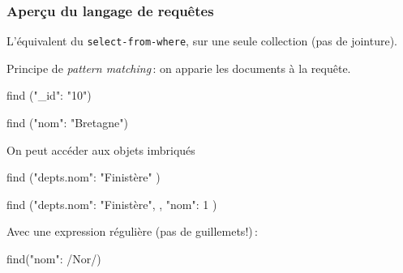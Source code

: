 \begin{frame}[fragile]
\frametitle{Aperçu du langage de requêtes}

L'équivalent du \texttt{select-from-where}, \alert{sur une
seule collection} (pas de \alert{jointure}).

\vfill

Principe de \textit{pattern matching}\,: on apparie
les documents à la requête.

\vfill

\begin{redbullet}
\item 
\begin{smallverbatim}
find ({"_id": "10"})
\end{smallverbatim}

\item
\begin{smallverbatim}
find ({"nom": "Bretagne"})
\end{smallverbatim}
\item
On peut accéder aux objets imbriqués


\begin{smallverbatim}
find ({"depts.nom": "Finistère"} )
\end{smallverbatim}
\item

\begin{smallverbatim}
find ({"depts.nom": "Finistère"}, , {"nom": 1} )
\end{smallverbatim}
\item
Avec une expression régulière (pas de guillemets!)\,:


\begin{smallverbatim}
find({"nom":  /Nor/})
\end{smallverbatim}

\end{redbullet}
\end{frame}



